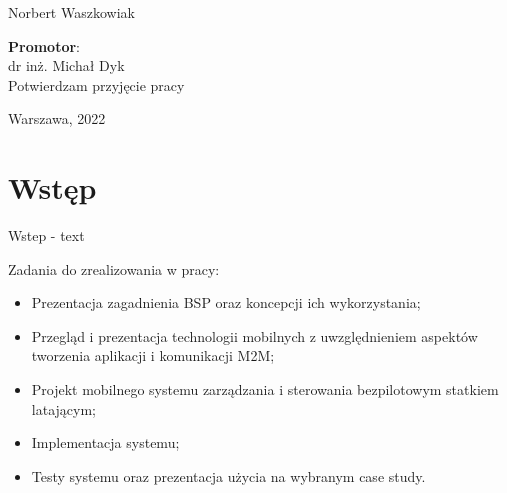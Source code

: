 \documentclass[12pt, a4paper, twoside]{report}
\begin{document}
\begin{titlepage}
\vspace{0.5cm} %

\begin{center}
	\Large {Norbert Waszkowiak}
\end{center}


\vspace{1cm}

\hfill
\begin{minipage}[t]{0.45\textwidth}
	\begin{flushleft}
		\begin{Large}
			\textbf  {Promotor}: \\ 
			dr inż. Michał Dyk \\
			\vspace{0.5cm}
			Potwierdzam przyjęcie pracy
		\end{Large}
	\end{flushleft}
\end{minipage}

\vspace{4cm}

\begin{center} 
Warszawa, 2022
\end{center}

\end{titlepage}


\tableofcontents %


 
\chapter*{Wstęp} %
\hspace{1cm}Wstep - text

Zadania do zrealizowania w pracy:
\begin{itemize}
\item Prezentacja zagadnienia BSP oraz koncepcji ich wykorzystania;
\item Przegląd i prezentacja technologii mobilnych z uwzględnieniem aspektów tworzenia aplikacji i komunikacji M2M;
\item Projekt mobilnego systemu zarządzania i sterowania bezpilotowym statkiem latającym;
\item Implementacja systemu;
\item Testy systemu oraz prezentacja użycia na wybranym case study.
\end{itemize}
\newpage	
\end{document}
